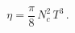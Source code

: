 \begin{equation}
  \label{eq:dual viscosity}
  \eta = \frac{\pi}{8} \, N_c^2 \, T^3 \,.
\end{equation}

